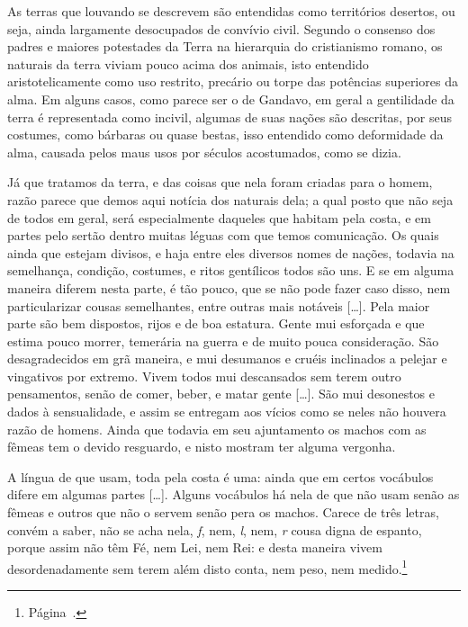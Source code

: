 As terras que louvando se descrevem são entendidas como territórios
desertos, ou seja, ainda largamente desocupados de convívio civil.
Segundo o consenso dos padres e maiores potestades da Terra na
hierarquia do cristianismo romano, os naturais da terra viviam pouco
acima dos animais, isto entendido aristotelicamente como uso restrito,
precário ou torpe das potências superiores da alma. Em alguns casos,
como parece ser o de Gandavo, em geral a gentilidade da terra é
representada como incivil, algumas de suas nações são descritas, por
seus costumes, como bárbaras ou quase bestas, isso entendido como
deformidade da alma, causada pelos maus usos por séculos acostumados,
como se dizia.
\begin{hedraquote}
Já que tratamos da terra, e das coisas que nela foram criadas para o
homem, razão parece que demos aqui notícia dos naturais dela; a qual
posto que não seja de todos em geral, será especialmente daqueles que
habitam pela costa, e em partes pelo sertão dentro muitas léguas com
que temos comunicação. Os quais ainda que estejam divisos, e haja entre
eles diversos nomes de nações, todavia na semelhança, condição,
costumes, e ritos gentílicos todos são uns. E se em alguma maneira diferem
nesta parte, é tão pouco, que se não pode fazer caso disso, nem
particularizar cousas semelhantes, entre outras mais notáveis [\ldots{}]. 
Pela maior parte são bem dispostos, rijos e de boa estatura. Gente mui
esforçada e que estima pouco morrer, temerária na guerra e de muito
pouca consideração. São desagradecidos em grã maneira, e mui desumanos
e cruéis inclinados a pelejar e vingativos por extremo. Vivem todos mui
descansados sem terem outro pensamentos, senão de comer, beber, e matar
gente [\ldots{}].  São mui desonestos e dados à sensualidade, e assim se
entregam aos vícios como se neles não houvera razão de homens. Ainda
que todavia em seu ajuntamento os machos com as fêmeas tem o devido
resguardo, e nisto mostram ter alguma vergonha.

A língua de que usam,
toda pela costa é uma: ainda que em certos vocábulos difere em algumas
partes [\ldots{}]. Alguns vocábulos há nela de que não usam senão as fêmeas  e outros
que não o servem senão pera os machos. Carece de três letras, convém a
saber, não se acha nela, \textit{f}, nem, \textit{l}, nem, \textit{r} cousa digna de espanto, porque
assim não têm Fé, nem Lei, nem Rei: e desta maneira vivem
desordenadamente sem terem além disto conta, nem peso, nem medido.\footnote{ Página~\pageref{feleirei}.}
\end{hedraquote}

